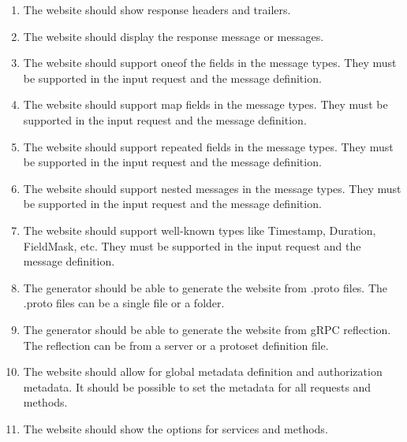 \begin{enumerate}[label=\textbf{F\arabic*}, labelwidth=!, labelsep=*, align=left, leftmargin=*]
    \item {}
    The website should show response headers and trailers.

    \item {}
    The website should display the response message or messages.

    \item {}
    The website should support oneof the fields in the message types.
    They must be supported in the input request and the message definition.

    \item {}
    The website should support map fields in the message types.
    They must be supported in the input request and the message definition.

    \item {}
    The website should support repeated fields in the message types.
    They must be supported in the input request and the message definition.

    \item {}
    The website should support nested messages in the message types.
    They must be supported in the input request and the message definition.

    \item {}
    The website should support well-known types like Timestamp, Duration, FieldMask, etc.
    They must be supported in the input request and the message definition.

    \item {}
    The generator should be able to generate the website from .proto files.
    The .proto files can be a single file or a folder.

    \item {}
    The generator should be able to generate the website from gRPC reflection.
    The reflection can be from a server or a protoset definition file.

    \item {}
    The website should allow for global metadata definition and authorization metadata.
    It should be possible to set the metadata for all requests and methods.

    \item {}
    The website should show the options for services and methods.
\end{enumerate}

